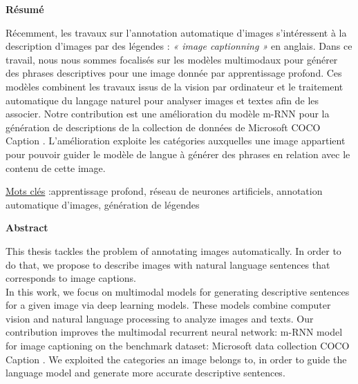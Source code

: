 \newpage
\noindent \textbf{\Huge{Résumé}}

\vspace{1cm}

Récemment, les travaux sur l'annotation automatique d'images s'intéressent à la description d'images par des légendes : \textit{« image captionning »} en anglais. Dans ce travail, nous nous sommes focalisés sur les modèles multimodaux pour générer des phrases descriptives pour une image donnée par apprentissage profond. Ces modèles combinent les travaux issus de la vision par ordinateur et le traitement automatique du langage naturel pour analyser images et textes afin de les associer. Notre contribution est une amélioration du modèle m-RNN \cite{mao2014explain} \cite{mao2014deep} pour la génération de descriptions de la collection de données de Microsoft COCO Caption \cite{chen2015microsoft}. L'amélioration exploite les catégories auxquelles une image appartient pour pouvoir guider le modèle de langue à générer des phrases en relation avec le contenu de cette image.
\vspace{1cm}

\noindent \underline{Mots clés} :apprentissage profond, réseau de neurones artificiels, annotation automatique d'images, génération de légendes

\vspace{1cm}

\noindent \textbf{\Huge{Abstract}}

\vspace{1cm}

This thesis tackles the problem of annotating images automatically. In order to do that, we propose to describe images with natural language sentences that corresponds to image captions.\\
In this work, we focus on multimodal models for generating descriptive sentences for a given image via deep learning models. These models combine computer vision and natural language processing to analyze images and texts. Our contribution improves the multimodal recurrent neural network: m-RNN model \cite {mao2014explain} \cite {mao2014deep} for image captioning on the benchmark dataset: Microsoft data collection COCO Caption \cite{chen2015microsoft}. We exploited the categories  an image belongs to, in order to guide the language model and generate more accurate descriptive sentences.
 

